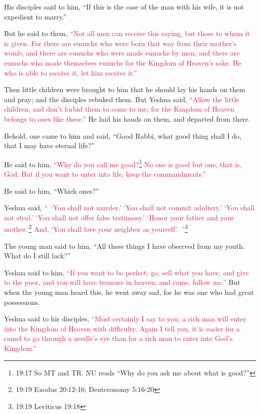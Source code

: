 \myverse{}His disciples said to him, “If this is the case of the man with
his wife, it is not expedient to marry.”

\myverse{}But he said to them,
\textcolor{crimson}{“Not all men can receive this saying, but those to whom it is given.
}
\myverse{}\textcolor{crimson}{For there are eunuchs who were born that way from their mother’s womb,
	and there are eunuchs who were made eunuchs by men; and there are eunuchs who made themselves eunuchs
	for the Kingdom of Heaven’s sake. He who is able to receive it, let him receive it.”}

\myverse{}Then little children were brought to him that he should lay
his hands on them and pray; and the disciples rebuked them.
\myverse{}But Yeshua said,
\textcolor{crimson}{“Allow the little children, and don’t forbid them to come to me; for the Kingdom of Heaven belongs
	to ones like these.”}
\myverse{}He laid his hands on them, and departed from there.

\myverse{}Behold, one came to him and said, “Good Rabbi, what good thing
shall I do, that I may have eternal life?”

\myverse{}He said to him,
\textcolor{crimson}{“Why do you call me good?}\footnote{19:17 So MT and TR. NU reads “Why do you ask me about what is good?”}
\textcolor{crimson}{No one is good but one, that is, God. But if you want to enter into life, keep the commandments.”
}

\myverse{}He said to him, “Which ones?”

Yeshua said,
\textcolor{crimson}{“ ‘You shall not murder.’ ‘You shall not commit adultery.’ ‘You shall not steal.’ ‘You shall not offer
	false testimony.’
}
\myverse{}\textcolor{crimson}{‘Honor your father and your mother.’}\footnote{19:19 Exodus 20:12-16;
	Deuteronomy 5:16-20}
\textcolor{crimson}{And, ‘You shall love your neighbor as yourself.’ ”}\footnote{19:19 Leviticus 19:18}

\myverse{}The young man said to him, “All these things I have observed
from my youth. What do I still lack?”

\myverse{}Yeshua said to him,
\textcolor{crimson}{“If you want to be perfect, go, sell what you have, and give to the poor, and you will have treasure
	in heaven; and come, follow me.”}
\myverse{}But when the young man heard this, he went away sad, for he was one who had
great possessions.

\myverse{}Yeshua said to his disciples,
\textcolor{crimson}{“Most certainly I say to you, a rich man will enter into the Kingdom of Heaven with difficulty.
}
\myverse{}\textcolor{crimson}{Again I tell you, it is easier for a camel to go through a needle’s eye
	than for a rich man to enter into God’s Kingdom.”}

